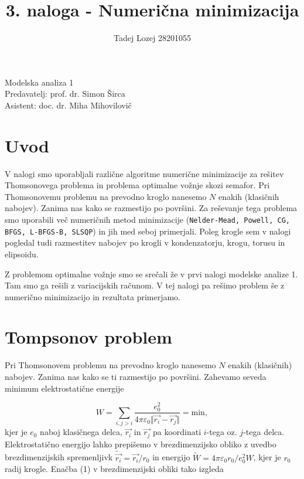 \documentclass[slovene,11pt,a4paper]{article}
\begin{document}
\title{3. naloga - Numerična minimizacija}
\author{Tadej Lozej 28201055}
\maketitle
\begin{center}
Modelska analiza 1 \\
\bigskip
Predavatelj: prof. dr. Simon Širca \\
Asistent: doc. dr. Miha Mihovilovič
\end{center}

\newpage

\tableofcontents

\newpage

\section{Uvod}


V nalogi smo uporabljali različne algoritme numerične minimizacije za rešitev Thomsonovega problema in problema optimalne vožnje skozi semafor. Pri Thomsonovemu problemu na prevodno kroglo nanesemo $N$ enakih (klasičnih nabojev). Zanima nas kako se razmestijo po površini. Za reševanje tega problema smo uporabili več numeričnih metod minimizacije (\texttt{Nelder-Mead, Powell, CG, BFGS, L-BFGS-B, SLSQP}) in jih med seboj primerjali. Poleg krogle sem v nalogi pogledal tudi razmestitev nabojev po krogli v kondenzatorju, krogu, torusu in elipsoidu.

Z problemom optimalne vožnje smo se srečali že v prvi nalogi modelske analize 1. Tam smo ga rešili z variacijskih računom. V tej nalogi pa rešimo problem še z numerično minimizacijo in rezultata primerjamo.

\section{Tompsonov problem}

Pri Thomsonovem problemu na prevodno kroglo nanesemo $N$ enakih (klasičnih) nabojev. Zanima nas kako se ti razmestijo po površini. Zahevamo seveda minimum elektrostatične energije

\begin{equation}
W = \sum_{i, j>i} \frac{e_0^2}{4\pi\varepsilon_0 \Vert \vec{r_i}-\vec{r_j} \Vert} = \text{min},
\end{equation}
kjer je $e_0$ naboj klasičnega delca, $\vec{r_i}$ in $\vec{r_j}$ pa koordinati $i$-tega oz. $j$-tega delca. Elektrostatično energijo lahko prepišemo v brezdimenzijsko obliko z uvedbo brezdimenzijskih spremenljivk $\tilde{\vec{r_i}} = \vec{r_i}/r_0$ in energijo $\tilde{W} = 4\pi \varepsilon_0 r_0 / e_0^2 W$, kjer je $r_0$ radij krogle. Enačba (1) v brezdimenzijski obliki tako izgleda
\end{document}
